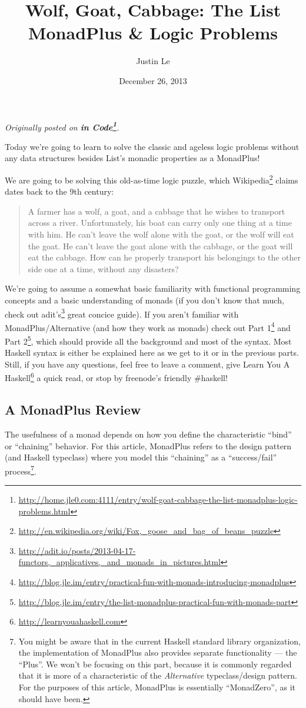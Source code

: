 \documentclass[]{article}
\title{Wolf, Goat, Cabbage: The List MonadPlus \& Logic Problems}
\author{Justin Le}
\date{December 26, 2013}
\renewcommand{\href}[2]{#2\footnote{\url{#1}}}
\begin{document}
\maketitle

\emph{Originally posted on
\textbf{\href{http://home.jle0.com:4111/entry/wolf-goat-cabbage-the-list-monadplus-logic-problems.html}{in
Code}}.}

Today we're going to learn to solve the classic and ageless logic problems
without any data structures besides List's monadic properties as a MonadPlus!

We are going to be solving this old-as-time logic puzzle, which
\href{http://en.wikipedia.org/wiki/Fox,_goose_and_bag_of_beans_puzzle}{Wikipedia}
claims dates back to the 9th century:

\begin{quote}
A farmer has a wolf, a goat, and a cabbage that he wishes to transport across a
river. Unfortunately, his boat can carry only one thing at a time with him. He
can't leave the wolf alone with the goat, or the wolf will eat the goat. He
can't leave the goat alone with the cabbage, or the goat will eat the cabbage.
How can he properly transport his belongings to the other side one at a time,
without any disasters?
\end{quote}

We're going to assume a somewhat basic familiarity with functional programming
concepts and a basic understanding of monads (if you don't know that much, check
out
\href{http://adit.io/posts/2013-04-17-functors,_applicatives,_and_monads_in_pictures.html}{adit's}
great concice guide). If you aren't familiar with MonadPlus/Alternative (and how
they work as monads) check out
\href{http://blog.jle.im/entry/practical-fun-with-monads-introducing-monadplus}{Part
1} and
\href{http://blog.jle.im/entry/the-list-monadplus-practical-fun-with-monads-part}{Part
2}, which should provide all the background and most of the syntax. Most Haskell
syntax is either be explained here as we get to it or in the previous parts.
Still, if you have any questions, feel free to leave a comment, give
\href{http://learnyouahaskell.com}{Learn You A Haskell} a quick read, or stop by
freenode's friendly \#haskell!

\subsection{A MonadPlus Review}\label{a-monadplus-review}

The usefulness of a monad depends on how you define the characteristic ``bind''
or ``chaining'' behavior. For this article, MonadPlus refers to the design
pattern (and Haskell typeclass) where you model this ``chaining'' as a
``success/fail'' process\footnote{You might be aware that in the current Haskell
  standard library organization, the implementation of MonadPlus also provides
  separate functionality --- the ``Plus''. We won't be focusing on this part,
  because it is commonly regarded that it is more of a characteristic of the
  \emph{Alternative} typeclass/design pattern. For the purposes of this article,
  MonadPlus is essentially ``MonadZero'', as it should have been.}.
\end{document}
